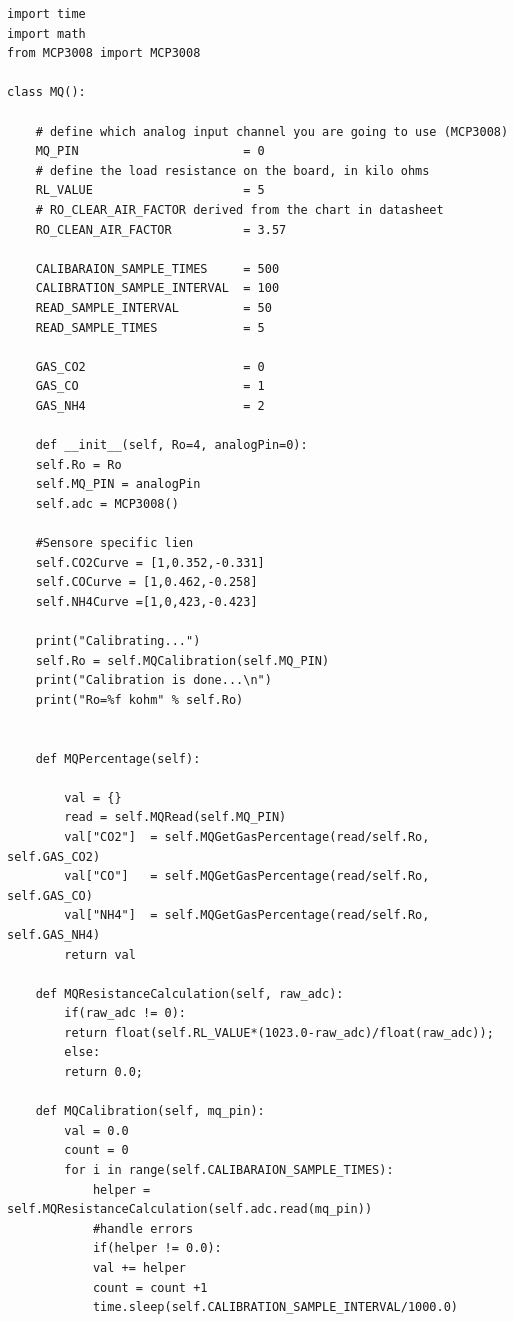 
\addchap{\langanhang}
\renewcommand{\thefigure}{A\arabic{figure}}

\setcounter{figure}{0}

\begin{lstlisting}[label=list:MQClass, caption={Auswertung der MQ-Sensorwerte}]
import time
import math
from MCP3008 import MCP3008

class MQ():

	# define which analog input channel you are going to use (MCP3008)
	MQ_PIN                       = 0        
	# define the load resistance on the board, in kilo ohms
	RL_VALUE                     = 5        
	# RO_CLEAR_AIR_FACTOR derived from the chart in datasheet
	RO_CLEAN_AIR_FACTOR          = 3.57    
	
	CALIBARAION_SAMPLE_TIMES     = 500       
	CALIBRATION_SAMPLE_INTERVAL  = 100      
	READ_SAMPLE_INTERVAL         = 50       
	READ_SAMPLE_TIMES            = 5        
	
	GAS_CO2                      = 0
	GAS_CO                       = 1
	GAS_NH4                      = 2
	
	def __init__(self, Ro=4, analogPin=0):
	self.Ro = Ro
	self.MQ_PIN = analogPin
	self.adc = MCP3008()
	
	#Sensore specific lien
	self.CO2Curve = [1,0.352,-0.331]   
	self.COCurve = [1,0.462,-0.258]  
	self.NH4Curve =[1,0,423,-0.423]   
	
	print("Calibrating...")
	self.Ro = self.MQCalibration(self.MQ_PIN)
	print("Calibration is done...\n")
	print("Ro=%f kohm" % self.Ro)
	
	
	def MQPercentage(self):
	
		val = {}
		read = self.MQRead(self.MQ_PIN)
		val["CO2"]  = self.MQGetGasPercentage(read/self.Ro, self.GAS_CO2)
		val["CO"]   = self.MQGetGasPercentage(read/self.Ro, self.GAS_CO)
		val["NH4"]  = self.MQGetGasPercentage(read/self.Ro, self.GAS_NH4)
		return val
	
	def MQResistanceCalculation(self, raw_adc):
		if(raw_adc != 0):
		return float(self.RL_VALUE*(1023.0-raw_adc)/float(raw_adc));            
		else:
		return 0.0;
	
	def MQCalibration(self, mq_pin):
		val = 0.0
		count = 0
		for i in range(self.CALIBARAION_SAMPLE_TIMES):          
			helper = self.MQResistanceCalculation(self.adc.read(mq_pin))
			#handle errors		
			if(helper != 0.0):
			val += helper
			count = count +1
			time.sleep(self.CALIBRATION_SAMPLE_INTERVAL/1000.0)
	

\end{lstlisting}
